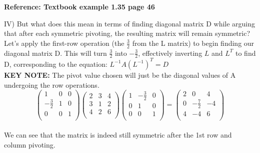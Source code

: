 \documentclass{article}
\begin{document}
\textbf{Reference: Textbook example 1.35 page 46}

IV) But what does this mean in terms of finding diagonal matrix D while arguing that after each symmetric pivoting, the resulting matrix will remain symmetric?\\

Let's apply the first-row operation (the $\frac{3}{2}$ from the L matrix) to begin finding our diagonal matrix D. This will turn $\frac{3}{2}$ into $-\frac{3}{2}$, effectively inverting $L$ and $L^T$ to find D, corresponding to the equation: $L^{-1}A(L^{-1})^T = D$\\

\textbf{KEY NOTE:} The pivot value chosen will just be the diagonal values of A undergoing the row operations.\\

\[
\left(
\begin{array}{rrr}
1 & 0 & 0 \\
-\frac{3}{2} & 1 & 0 \\
0 & 0 & 1 \\
\end{array}
\right)
\left(
\begin{array}{rrr}
2 & 3 & 4 \\
3 & 1 & 2 \\
4 & 2 & 6 \\
\end{array}
\right)
\left(
\begin{array}{rrr}
1 & -\frac{3}{2} & 0 \\
0 & 1 & 0 \\
0 & 0 & 1 \\
\end{array}
\right) = 
\left(
\begin{array}{rrr}
2 & 0 & 4 \\
0 & -\frac{7}{2} & -4 \\
4 & -4 & 6 \\
\end{array}
\right)
\]\\
We can see that the matrix is indeed still symmetric after the 1st row and column pivoting.\\
\end{document}
